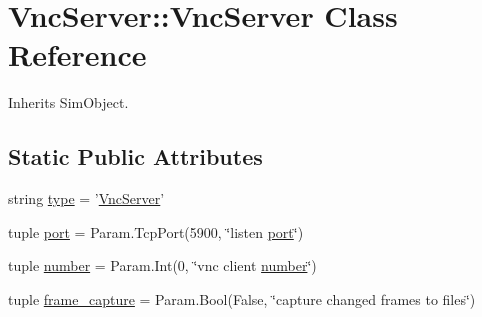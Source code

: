 \hypertarget{classVncServer_1_1VncServer}{
\section{VncServer::VncServer Class Reference}
\label{classVncServer_1_1VncServer}
}


Inherits SimObject.

\subsection*{Static Public Attributes}
\begin{DoxyCompactItemize}
\item 
string \hyperlink{classVncServer_1_1VncServer_a18b1167e6c0414f5bbe76116e29e81c8}{type} = '\hyperlink{classVncServer_1_1VncServer}{VncServer}'
\item 
tuple \hyperlink{classVncServer_1_1VncServer_acd53d0ea3e4e1a0f99372c165be452c5}{port} = Param.TcpPort(5900, \char`\"{}listen \hyperlink{classport}{port}\char`\"{})
\item 
tuple \hyperlink{classVncServer_1_1VncServer_a04d2358b5b6b9071d763987c65ffc42a}{number} = Param.Int(0, \char`\"{}vnc client \hyperlink{classVncServer_1_1VncServer_a04d2358b5b6b9071d763987c65ffc42a}{number}\char`\"{})
\item 
tuple \hyperlink{classVncServer_1_1VncServer_ae12ce7ac563c8d2605be5bb314695293}{frame\_\-capture} = Param.Bool(False, \char`\"{}capture changed frames to files\char`\"{})
\end{DoxyCompactItemize}


